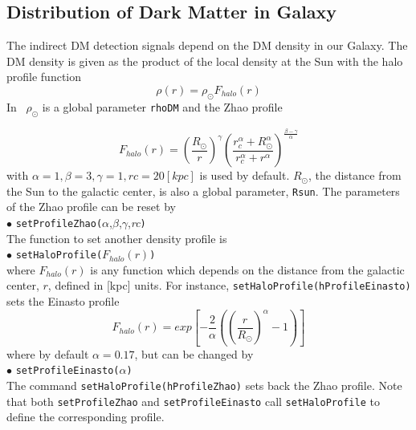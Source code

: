 \documentclass[12pt,a4paper]{article}
\begin{document}
\subsection{Distribution of Dark Matter  in Galaxy}
The indirect DM detection signals depend on the DM density in our Galaxy.
The DM density is given as the product of the local density at the Sun with the halo profile function 
\begin{equation}
\rho(r)=\rho_\odot F_{halo}(r)
\end{equation}
In \micro\, $\rho_\odot$ is a global parameter {\tt rhoDM} and  the Zhao profile~\cite{Zhao:1995cp}

\begin{equation}
\label{rho}
F_{halo}(r)=\left(\frac{ R_\odot}{r}\right)^{\gamma}
\left(\frac{r_c^{\alpha}+ R_\odot^{\alpha}}
{r_c^{\alpha}+r^{\alpha}}\right)^{\frac{\beta -\gamma}{\alpha}}
\end{equation}
with   $\alpha=1,\beta=3,\gamma=1, rc=20[kpc]$ is used by
default. $R_\odot$, the distance from the Sun to the galactic center,  is also a global parameter, {\tt Rsun}. The parameters of the Zhao profile  can be reset by\\ 
\noindent
$\bullet$ \verb|setProfileZhao(|$\alpha$,$\beta$,$\gamma$,{\it rc}\verb|)|\\
The function to set another  density profile is\\ 
\noindent
$\bullet$ \verb|setHaloProfile(|$F_{halo}(r)$\verb|)|\\
where $F_{halo}(r)$ is any function which depends on the distance from the galactic center,  $r$,
 defined   in [kpc] units.
For instance, \verb|setHaloProfile(hProfileEinasto)|  sets the Einasto profile\\
\begin{equation}
F_{halo}(r)=exp\left[-\frac{2}{\alpha}\left(\left(\frac{r}{R_\odot}\right)^{\alpha}-1\right)\right]
\end{equation}
where by default $\alpha=0.17$,   but can be changed by \\ 
\noindent
$\bullet$ \verb|setProfileEinasto(|$\alpha$\verb|)| \\
The command \verb|setHaloProfile(hProfileZhao)| sets back the Zhao profile. Note
that both {\tt setProfileZhao} and {\tt setProfileEinasto} call
{\tt setHaloProfile} to define the corresponding profile. 
\end{document}
